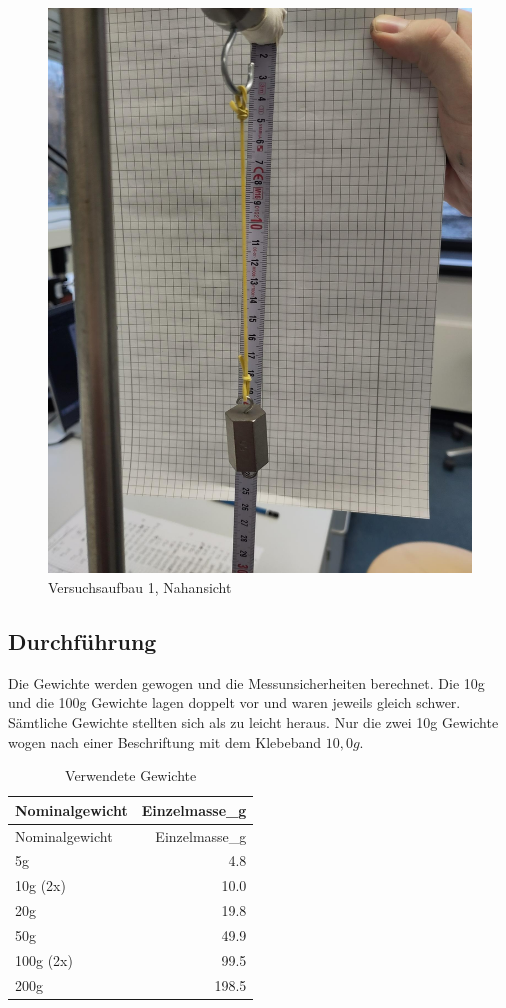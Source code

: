 \documentclass[
  9pt,
]{article}
\begin{document}
\begin{figure}
\centering
\includegraphics[width=\textwidth,height=0.2\textheight]{Bilder/V2B1.jpeg}
\caption{Versuchsaufbau 1, Nahansicht}
\end{figure}

\hypertarget{durchfuxfchrung}{%
\subsection{Durchführung}\label{durchfuxfchrung}}

Die Gewichte werden gewogen und die Messunsicherheiten berechnet. Die
10g und die 100g Gewichte lagen doppelt vor und waren jeweils gleich
schwer. Sämtliche Gewichte stellten sich als zu leicht heraus. Nur die
zwei 10g Gewichte wogen nach einer Beschriftung mit dem Klebeband
\(10,0g\).

\begin{longtable}[]{@{}lr@{}}
\caption{Verwendete Gewichte}\tabularnewline
\toprule()
Nominalgewicht & Einzelmasse\_g \\
\midrule()
\endfirsthead
\toprule()
Nominalgewicht & Einzelmasse\_g \\
\midrule()
\endhead
5g & 4.8 \\
10g (2x) & 10.0 \\
20g & 19.8 \\
50g & 49.9 \\
100g (2x) & 99.5 \\
200g & 198.5 \\
\bottomrule()
\end{longtable}
\end{document}
